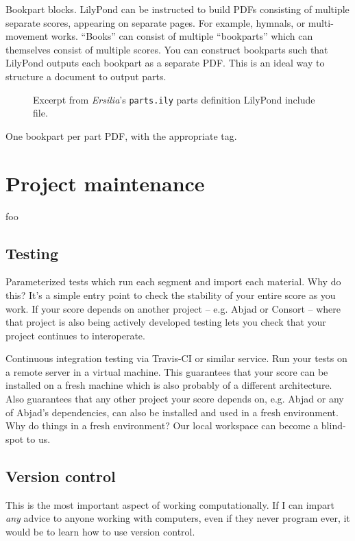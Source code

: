 Bookpart blocks. LilyPond can be instructed to build PDFs consisting of
multiple separate scores, appearing on separate pages. For example, hymnals, or
multi-movement works. \enquote{Books} can consist of multiple
\enquote{bookparts} which can themselves consist of multiple scores. You can
construct bookparts such that LilyPond outputs each bookpart as a separate PDF.
This is an ideal way to structure a document to output parts.

\begin{figure}[h!]
\vspace{-0.5\baselineskip}
\caption{Excerpt from \emph{Ersilia}'s \texttt{parts.ily} parts definition
LilyPond include file.}
\end{figure}

One bookpart per part PDF, with the appropriate tag.

\section{Project maintenance}
\label{sec:project-maintenance}

foo

\subsection{Testing}
\label{ssec:testing}

Parameterized tests which run each segment and import each material. Why do
this? It's a simple entry point to check the stability of your entire score as
you work. If your score depends on another project -- e.g. Abjad or Consort --
where that project is also being actively developed testing lets you check that
your project continues to interoperate.

Continuous integration testing via Travis-CI or similar service. Run your tests
on a remote server in a virtual machine. This guarantees that your score can be
installed on a fresh machine which is also probably of a different
architecture. Also guarantees that any other project your score depends on,
e.g. Abjad or any of Abjad's dependencies, can also be installed and used in a
fresh environment. Why do things in a fresh environment? Our local workspace
can become a blind-spot to us.

\subsection{Version control}
\label{ssec:version-control}

This is the most important aspect of working computationally. If I can impart
\emph{any} advice to anyone working with computers, even if they never program
ever, it would be to learn how to use version control.